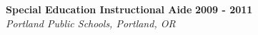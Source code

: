 \documentclass[11pt]{article}
\begin{document}
\medbreak \noindent
%
\textbf{Special Education Instructional Aide} \hfill \textbf{2009 - 2011}\\
\textit{Portland Public Schools, Portland, OR}\\
%
\end{document}
